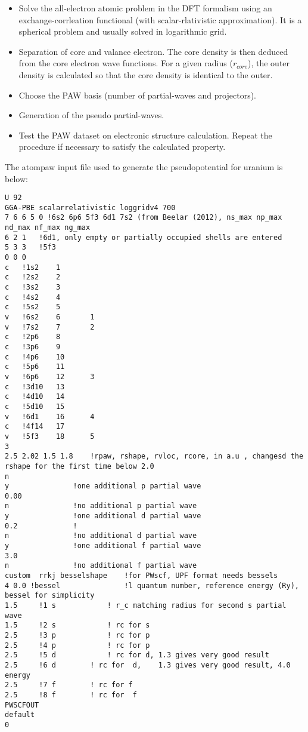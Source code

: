 \begin{itemize}
	\item Solve the all-electron atomic problem in the DFT formalism using an exchange-corrleation functional (with scalar-rlativistic approximation). It is a spherical problem and usually solved in logarithmic grid.
	\item Separation of core and valance electron. The core density is then deduced from the core electron wave functions. For a given radius ($r_{core}$), the outer density is calculated so that the core density is identical to the outer.
	\item Choose the PAW basis (number of partial-waves and projectors).
	\item Generation of the pseudo partial-waves.
	\item Test the PAW dataset on electronic structure calculation. Repeat the procedure if necessary to satisfy the calculated property.
\end{itemize}
\pagebreak
The atompaw input file used to generate the pseudopotential for uranium is below:
\lstset{style=atpw}
\begin{lstlisting}
U 92
GGA-PBE	scalarrelativistic loggridv4 700 
7 6 6 5 0 !6s2 6p6 5f3 6d1 7s2 (from Beelar (2012), ns_max np_max nd_max nf_max ng_max
6 2 1	!6d1, only empty or partially occupied shells are entered
5 3 3	!5f3
0 0 0
c	!1s2	1	
c	!2s2	2
c	!3s2	3
c	!4s2	4
c	!5s2	5
v	!6s2	6		1
v	!7s2	7		2
c	!2p6	8
c	!3p6	9
c	!4p6	10
c	!5p6	11		
v	!6p6	12		3
c	!3d10	13
c	!4d10	14
c	!5d10	15
v	!6d1	16		4
c	!4f14	17
v	!5f3	18		5
3
2.5 2.02 1.5 1.8	!rpaw, rshape, rvloc, rcore, in a.u , changesd the rshape for the first time below 2.0
n
y				!one additional p partial wave
0.00
n				!no additional p partial wave
y				!one additional d partial wave
0.2				!
n				!no additional d partial wave
y				!one additional f partial wave
3.0
n				!no additional f partial wave
custom  rrkj besselshape    !for PWscf, UPF format needs bessels        
4 0.0 !bessel     			!l quantum number, reference energy (Ry), bessel for simplicity
1.5		!1 s			! r_c matching radius for second s partial wave
1.5		!2 s			! rc for s
2.5		!3 p			! rc for p
2.5		!4 p			! rc for p
2.5		!5 d	        ! rc for d, 1.3 gives very good result
2.5		!6 d        ! rc for  d,	1.3 gives very good result, 4.0 energy
2.5		!7 f        ! rc for f
2.5		!8 f        ! rc for  f
PWSCFOUT
default
0

\end{lstlisting}




